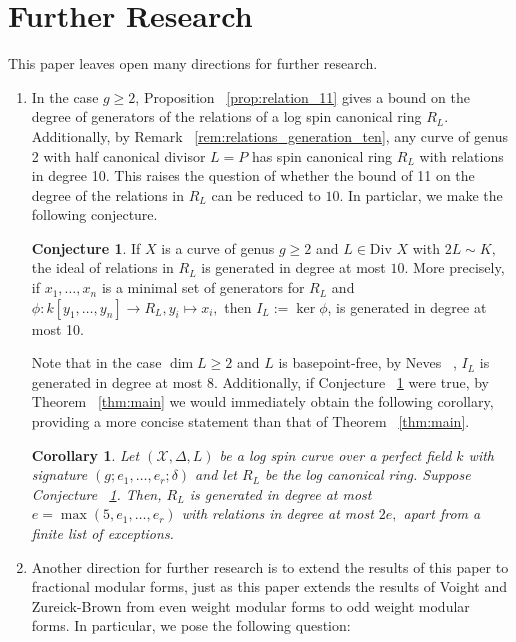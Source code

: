 \documentclass{amsart}
\theoremstyle{plain}
\newtheorem{cor}[thm]{Corollary}
\theoremstyle{definition}
\newtheorem{conjecture}[thm]{Conjecture}
\theoremstyle{remark}
\numberwithin{equation}{section}
\newcommand \sx{\mathscr X}
\newcommand \di{\text{Div }}
\begin{document}
\section{Further Research}
\label{sec:further-questions}

This paper leaves open many directions for further research.

\begin{enumerate}
	\item In the case $g \geq 2$, Proposition ~\ref{prop:relation_11} gives a bound on the degree of generators of the relations of a log spin canonical ring $R_L$. Additionally, by Remark ~\ref{rem:relations_generation_ten}, any curve of genus 2 with half canonical divisor $L = P$ has spin canonical ring $R_L$ with relations in degree 10. This raises the question of whether the bound of 11 on the degree of the relations in $R_L$ can be reduced to $10$. In particlar, we make the following conjecture.
\begin{conjecture}
\label{conj:relations-10}
If $X$ is a curve of genus $g \geq 2$ and $L \in \di X$ with $2L \sim K,$ the ideal of relations in $R_L$ is generated in degree at most $10$. More precisely, if $x_1,\ldots, x_n$ is a minimal set of generators for $R_L$ and $\phi:k[y_1,\ldots, y_n] \rightarrow R_L, y_i \mapsto x_i,$ then $I_L := \ker \phi$, is generated in degree at most 10. 
\end{conjecture}
Note that in the case $\dim L \geq 2$ and $L$ is basepoint-free, by Neves ~\cite[Proposition III.12]{neves:halfcan}, $I_L$ is generated in degree at most 8. Additionally, if Conjecture ~\ref{conj:relations-10} were true, by Theorem ~\ref{thm:main} we would immediately obtain the following corollary, providing a more concise statement than that of Theorem ~\ref{thm:main}.
\begin{cor}
\label{cor:main-refined}
Let $(\sx,\Delta,L)$ be a log spin curve over a perfect field $k$ with signature $(g;e_1,\ldots, e_r;\delta)$ and let $R_L$ be the log canonical ring. Suppose Conjecture ~\ref{conj:relations-10}. Then, $R_L$ is generated in degree at most $e = \max(5,e_1,\ldots, e_r)$ with relations in degree at most $2e,$ apart from a finite list of exceptions.
\end{cor}
	\item Another direction for further research is to extend the results of this paper to fractional modular forms, just as this paper extends the results of Voight and Zureick-Brown \cite{vzb:stacky} from even weight modular forms to odd weight modular forms. In particular, we pose the following question:

\end{enumerate}
\end{document}
